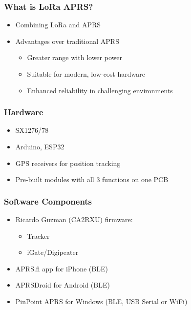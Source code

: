 \documentclass[aspectratio=169]{beamer}
\begin{document}
\begin{frame}[t]
  \frametitle{What is LoRa APRS?}
  \begin{itemize}
    \item Combining LoRa and APRS
    \medskip
    \item Advantages over traditional APRS
    \medskip
    \begin{itemize}
      \item Greater range with lower power
      \medskip
      \item Suitable for modern, low-cost hardware
      \medskip
      \item Enhanced reliability in challenging environments
    \end{itemize}
  \end{itemize}
\end{frame}

\begin{frame}[t]
  \frametitle{Hardware}
  \begin{itemize}
    \item SX1276/78
    \medskip
    \item Arduino, ESP32
    \medskip
    \item GPS receivers for position tracking
    \medskip
    \item Pre-built modules with all 3 functions on one PCB
  \end{itemize}
\end{frame}

\begin{frame}[t]
  \frametitle{Software Components}
  \begin{itemize}
  \item Ricardo Guzman (CA2RXU) firmware:
  \medskip
  \begin{itemize}
    \item Tracker
    \medskip
    \item iGate/Digipeater
  \end{itemize}
  \medskip
  \item APRS.fi app for iPhone (BLE)
  \medskip
  \item APRSDroid for Android (BLE)
  \medskip
  \item PinPoint APRS for Windows (BLE, USB Serial or WiFi)
  \end{itemize}
\end{frame}
\end{document}
